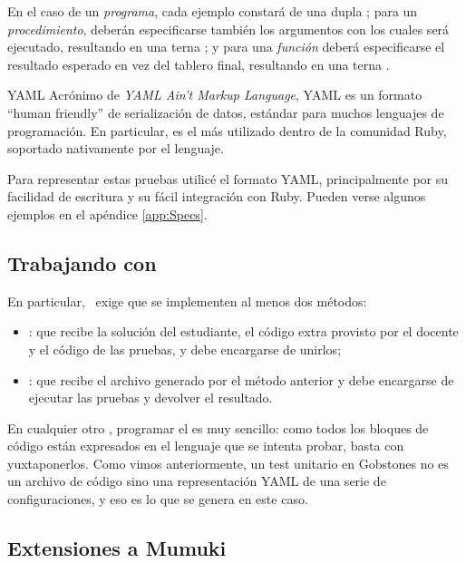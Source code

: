 En el caso de un \emph{programa}, cada ejemplo constará de una dupla ; para un \emph{procedimiento}, deberán especificarse también los argumentos con los cuales será ejecutado, resultando en una terna ; y para una \emph{función} deberá especificarse el resultado esperado en vez del tablero final, resultando en una terna .

\sepfootnotecontent
  {YAML}
  {Acrónimo de \emph{YAML Ain't Markup Language}, YAML es un formato ``human friendly'' de serialización de datos, estándar para muchos lenguajes de programación. En particular, es el más utilizado dentro de la comunidad Ruby, soportado nativamente por el lenguaje.}

Para representar estas pruebas utilicé el formato YAML, principalmente por su facilidad de escritura y su fácil integración con Ruby. Pueden verse algunos ejemplos en el apéndice \ref{app:Specs}.


\subsection{Trabajando con \mumukit}
En particular, \mumukit\ exige que se implementen al menos dos métodos:
\begin{itemize}
  \item{: que recibe la solución del estudiante, el código extra provisto por el docente y el código de las pruebas, y debe encargarse de unirlos;}
  \item{: que recibe el archivo generado por el método anterior y debe encargarse de ejecutar las pruebas y devolver el resultado.}
\end{itemize}

En cualquier otro \runner, programar el  es muy sencillo: como todos los bloques de código están expresados en el lenguaje que se intenta probar, basta con yuxtaponerlos. Como vimos anteriormente, un test unitario en Gobstones no es un archivo de código sino una representación YAML de una serie de configuraciones, y eso es lo que se genera en este caso.

\subsection{Extensiones a Mumuki}

